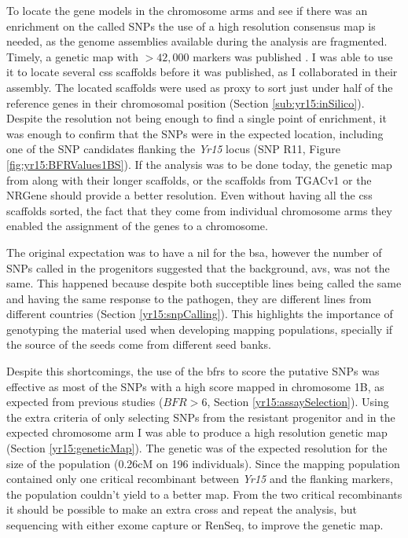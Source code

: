 To locate the gene models in the chromosome arms and see if there was an enrichment on the called SNPs the use of a high resolution consensus map is needed, as the genome assemblies available during the analysis are fragmented. 
Timely, a genetic map with $>42,000$ markers was published \citep{Wang2014}. 
I was able to use it to locate several \acrshort{css} scaffolds before it was published, as I collaborated in their assembly. 
The located scaffolds were used as proxy to sort just under half of the reference genes in their chromosomal position (Section \ref{sub:yr15:inSilico}). 
Despite the resolution not being enough to find a single point of enrichment, it was enough to confirm that the SNPs were in the expected location, including one of the SNP candidates flanking the \textit{Yr15} locus (SNP R11, Figure \ref{fig:yr15:BFRValues1BS}).  
If the analysis was to be done today, the genetic map from \citet{Chapman2015} along with their longer scaffolds, or the scaffolds from TGACv1 or the NRGene should provide a better resolution. 
Even without having all the \acrshort{css} scaffolds sorted, the fact that they come from individual chromosome arms they enabled the assignment of the genes to a chromosome. 


The original expectation was to have a \gls{nil} for the \acrshort{bsa}, however the number of SNPs called in the progenitors suggested that the background, \acrlong{avs}, was not the same.  
This happened because despite both succeptible lines being called the same and having the same response to the pathogen, they are different lines from different countries (Section \ref{yr15:snpCalling}). 
This highlights the importance of genotyping the material used when developing mapping populations, specially if the source of the seeds come from different seed banks. 


Despite this shortcomings, the use of the \glspl{bfr} to score the putative SNPs was effective as most of the SNPs with a high score  mapped in chromosome 1B, as expected from previous studies ($BFR>6$, Section \ref{yr15:assaySelection}).
Using the extra criteria of only selecting SNPs from the resistant progenitor and in the expected chromosome arm I was able to produce a high resolution genetic map (Section \ref{yr15:geneticMap}). 
The genetic was of the expected resolution for the size of the population (0.26cM on 196 individuals).
Since the mapping population contained only one critical recombinant between \textit{Yr15} and the flanking markers, the population couldn't yield to a better map. 
From the two critical recombinants it should be possible to make an extra cross and repeat the analysis, but sequencing with either exome capture or RenSeq, to improve the genetic map. 

